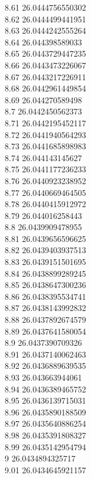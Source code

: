 {8.61	26.0444756550302\\
8.62	26.0444499441951\\
8.63	26.0444242555264\\
8.64	26.044398589033\\
8.65	26.0443729447235\\
8.66	26.0443473226067\\
8.67	26.0443217226911\\
8.68	26.0442961449854\\
8.69	26.044270589498\\
8.7	26.0442450562373\\
8.71	26.0442195452117\\
8.72	26.0441940564293\\
8.73	26.0441685898983\\
8.74	26.044143145627\\
8.75	26.0441177236233\\
8.76	26.0440923238952\\
8.77	26.0440669464505\\
8.78	26.0440415912972\\
8.79	26.044016258443\\
8.8	26.0439909478955\\
8.81	26.0439656596625\\
8.82	26.0439403937513\\
8.83	26.0439151501695\\
8.84	26.0438899289245\\
8.85	26.0438647300236\\
8.86	26.0438395534741\\
8.87	26.0438143992832\\
8.88	26.0437892674579\\
8.89	26.0437641580054\\
8.9	26.0437390709326\\
8.91	26.0437140062463\\
8.92	26.0436889639535\\
8.93	26.043663944061\\
8.94	26.0436389465752\\
8.95	26.0436139715031\\
8.96	26.0435890188509\\
8.97	26.0435640886254\\
8.98	26.0435391808327\\
8.99	26.0435142954794\\
9	26.0434894325717\\
9.01	26.0434645921157\\
}
